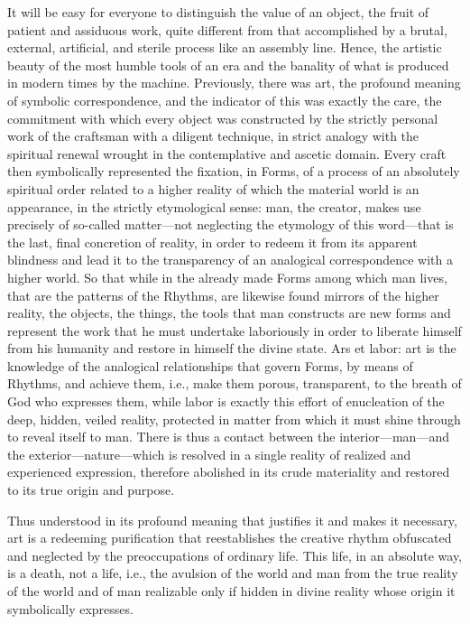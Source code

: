 It will be easy for everyone to distinguish the value of an object, the fruit of patient and assiduous work, quite different from that accomplished by a brutal, external, artificial, and sterile process like an assembly line. Hence, the artistic beauty of the most humble tools of an era and the banality of what is produced in modern times by the machine. Previously, there was art, the profound meaning of symbolic correspondence, and the indicator of this was exactly the care, the commitment with which every object was constructed by the strictly personal work of the craftsman with a diligent technique, in strict analogy with the spiritual renewal wrought in the contemplative and ascetic domain. Every craft then symbolically represented the fixation, in Forms, of a process of an absolutely spiritual order related to a higher reality of which the material world is an appearance, in the strictly etymological sense: man, the creator, makes use precisely of so-called matter—not neglecting the etymology of this word—that is the last, final concretion of reality, in order to redeem it from its apparent blindness and lead it to the transparency of an analogical correspondence with a higher world. So that while in the already made Forms among which man lives, that are the patterns of the Rhythms, are likewise found mirrors of the higher reality, the objects, the things, the tools that man constructs are new forms and represent the work that he must undertake laboriously in order to liberate himself from his humanity and restore in himself the divine state. Ars et labor: art is the knowledge of the analogical relationships that govern Forms, by means of Rhythms, and achieve them, i.e., make them porous, transparent, to the breath of God who expresses them, while labor is exactly this effort of enucleation of the deep, hidden, veiled reality, protected in matter from which it must shine through to reveal itself to man. There is thus a contact between the interior—man—and the exterior—nature—which is resolved in a single reality of realized and experienced expression, therefore abolished in its crude materiality and restored to its true origin and purpose.

Thus understood in its profound meaning that justifies it and makes it necessary, art is a redeeming purification that reestablishes the creative rhythm obfuscated and neglected by the preoccupations of ordinary life. This life, in an absolute way, is a death, not a life, i.e., the avulsion of the world and man from the true reality of the world and of man realizable only if hidden in divine reality whose origin it symbolically expresses.

